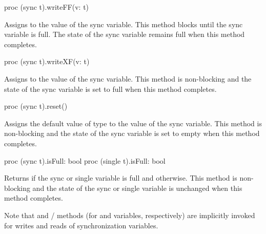 \begin{protohead}
proc (sync t).writeFF(v: t)
\end{protohead}
\begin{protobody}
Assigns  to the value of the sync variable.  This method
blocks until the sync variable is full.  The state of the sync
variable remains full when this method completes.
\end{protobody}

\begin{protohead}
proc (sync t).writeXF(v: t)
\end{protohead}
\begin{protobody}
Assigns  to the value of the sync variable.  This method is
non-blocking and the state of the sync variable is set to full when
this method completes.
\end{protobody}

\begin{protohead}
proc (sync t).reset()
\end{protohead}
\begin{protobody}
Assigns the default value of type  to the value of the sync
variable.  This method is non-blocking and the state of the sync
variable is set to empty when this method completes.
\end{protobody}

\begin{protohead}
proc (sync t).isFull: bool
proc (single t).isFull: bool
\end{protohead}
\begin{protobody}
Returns  if the sync or single variable is full and 
otherwise.  This method is non-blocking and the state of the sync or single
variable is unchanged when this method completes.
\end{protobody}

Note that  and / methods
(for  and  variables, respectively) are
implicitly invoked for writes and reads of synchronization variables.


